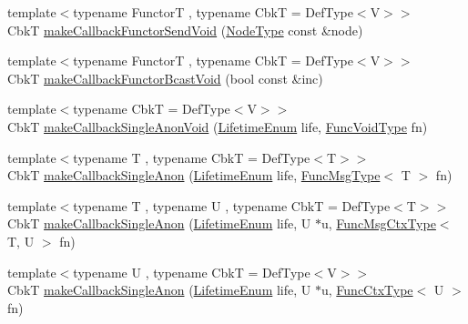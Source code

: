 \begin{DoxyCompactItemize}
\item 
{\footnotesize template$<$typename FunctorT , typename CbkT  = Def\+Type$<$\+V$>$$>$ }\\CbkT \hyperlink{structvt_1_1pipe_1_1_pipe_manager_t_l_ac2c128da30637e0672086df5abea84a3}{make\+Callback\+Functor\+Send\+Void} (\hyperlink{namespacevt_a866da9d0efc19c0a1ce79e9e492f47e2}{Node\+Type} const \&node)
\item 
{\footnotesize template$<$typename FunctorT , typename CbkT  = Def\+Type$<$\+V$>$$>$ }\\CbkT \hyperlink{structvt_1_1pipe_1_1_pipe_manager_t_l_af52b65bf8c8ded91ac833b77b3c3c50e}{make\+Callback\+Functor\+Bcast\+Void} (bool const \&inc)
\item 
{\footnotesize template$<$typename CbkT  = Def\+Type$<$\+V$>$$>$ }\\CbkT \hyperlink{structvt_1_1pipe_1_1_pipe_manager_t_l_ae239877cc157e7f5c95aa96421b7e1bb}{make\+Callback\+Single\+Anon\+Void} (\hyperlink{namespacevt_1_1pipe_acb42b284378c0fdac1d7c6335dc26f58}{Lifetime\+Enum} life, \hyperlink{structvt_1_1pipe_1_1_pipe_manager_base_acd6f0c71f38f08d53f85e83b65406d77}{Func\+Void\+Type} fn)
\item 
{\footnotesize template$<$typename T , typename CbkT  = Def\+Type$<$\+T$>$$>$ }\\CbkT \hyperlink{structvt_1_1pipe_1_1_pipe_manager_t_l_ad3ee09b4e7976de176b14d76d70b2bdb}{make\+Callback\+Single\+Anon} (\hyperlink{namespacevt_1_1pipe_acb42b284378c0fdac1d7c6335dc26f58}{Lifetime\+Enum} life, \hyperlink{structvt_1_1pipe_1_1_pipe_manager_base_aa54eee64ab32a27777a672d49eb861f4}{Func\+Msg\+Type}$<$ T $>$ fn)
\item 
{\footnotesize template$<$typename T , typename U , typename CbkT  = Def\+Type$<$\+T$>$$>$ }\\CbkT \hyperlink{structvt_1_1pipe_1_1_pipe_manager_t_l_a59f0de1aaa6ab7ea6b0eac0667b495f7}{make\+Callback\+Single\+Anon} (\hyperlink{namespacevt_1_1pipe_acb42b284378c0fdac1d7c6335dc26f58}{Lifetime\+Enum} life, U $\ast$u, \hyperlink{structvt_1_1pipe_1_1_pipe_manager_base_a73fdf82ece0411b3dc644c99b763f7a9}{Func\+Msg\+Ctx\+Type}$<$ T, U $>$ fn)
\item 
{\footnotesize template$<$typename U , typename CbkT  = Def\+Type$<$\+V$>$$>$ }\\CbkT \hyperlink{structvt_1_1pipe_1_1_pipe_manager_t_l_a4bdcd4bf9730aa312336568d005e6d01}{make\+Callback\+Single\+Anon} (\hyperlink{namespacevt_1_1pipe_acb42b284378c0fdac1d7c6335dc26f58}{Lifetime\+Enum} life, U $\ast$u, \hyperlink{structvt_1_1pipe_1_1_pipe_manager_base_ad8463823b6b4cfdb67c119d6d22e3bac}{Func\+Ctx\+Type}$<$ U $>$ fn)

\end{DoxyCompactItemize}
